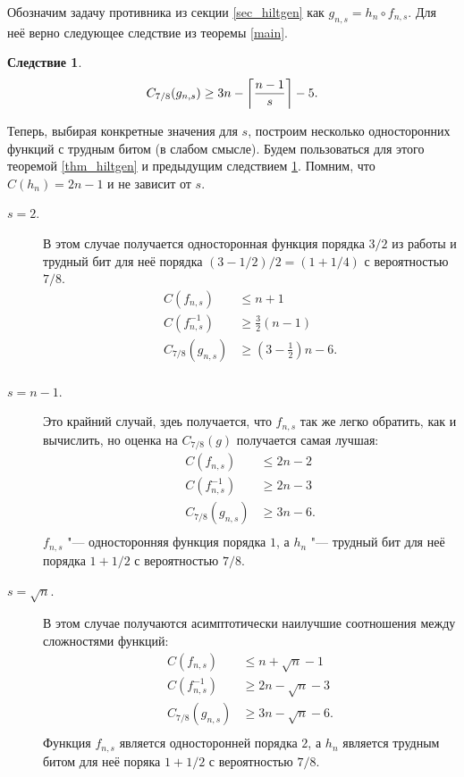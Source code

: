 \documentclass[oneside, a4paper]{article}
\newtheorem{corollary}{Следствие}
\theoremstyle{plain}
\theoremstyle{remark}
\DeclarePairedDelimiter\ceil{\lceil}{\rceil}
\begin{document}
Обозначим задачу противника из секции \ref{sec_hiltgen} как $g_{n, s} = h_n
\circ f_{n, s}$. Для неё верно следующее следствие из теоремы \ref{main}.

\begin{corollary}
\[
C_{7/8}(g_{n, s}) \geq 3n - \ceil*{\frac {n - 1} s} - 5.
\]
\label{corr_main}
\end{corollary}

Теперь, выбирая конкретные значения для $s$, построим несколько односторонних
функций с трудным битом (в слабом смысле). Будем пользоваться для этого теоремой
\ref{thm_hiltgen} и предыдущим следствием \ref{corr_main}. Помним, что $C(h_n) =
2n - 1$ и не зависит от $s$.

\begin{description}
\item[$s = 2$.] В этом случае получается односторонная функция порядка $3/2$ из
работы \cite{hiltgen1993} и трудный бит для неё порядка $(3 - 1/2) / 2 = (1 +
1/4)$ с вероятностью $7/8$.
\[
\begin{aligned}
C(f_{n, s}) &\leq n + 1 \\
C(f_{n, s}^{-1}) &\geq \frac 3 2 (n - 1) \\
C_{7/8}(g_{n, s}) &\geq (3 - \frac 1 2)n - 6. \\
\end{aligned}
\]
\item[$s = n - 1$.] Это крайний случай, здеь получается, что $f_{n, s}$ так же
легко обратить, как и вычислить, но оценка на $C_{7/8}(g)$ получается самая
лучшая:
\[
\begin{aligned}
C(f_{n, s}) &\leq 2n - 2 \\
C(f_{n, s}^{-1}) &\geq 2n - 3 \\
C_{7/8}(g_{n, s}) &\geq 3n - 6. \\
\end{aligned}
\]
$f_{n,s}$ "--- односторонняя функция порядка $1$, а $h_{n}$ "--- трудный бит для
неё порядка $1 + 1/2$ с вероятностью $7/8$.
\item[$s = \sqrt{n}$.] В этом случае получаются асимптотически наилучшие
соотношения между сложностями функций:
\[
\begin{aligned}
C(f_{n, s}) &\leq n + \sqrt{n} - 1 \\
C(f_{n, s}^{-1}) &\geq 2n - \sqrt n - 3 \\
C_{7/8}(g_{n, s}) &\geq 3n - \sqrt{n} - 6. \\
\end{aligned}
\]
Функция $f_{n, s}$ является односторонней порядка $2$, а $h_{n}$ является
трудным битом для неё поряка $1 + 1/2$ с вероятностью $7/8$.
\end{description}

{}

\end{document}
